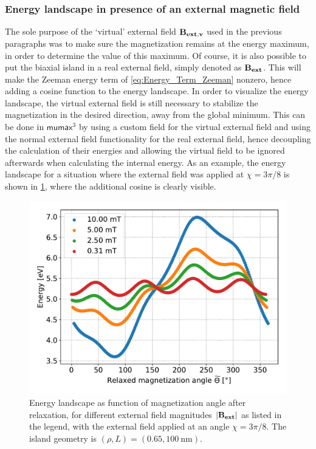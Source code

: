 \documentclass[11pt,a4paper,english]{article}
\newcommand{\mumax}{$\mathsf{mumax}^3$}
\begin{document}
\subsubsection{Energy landscape in presence of an external magnetic field}
The sole purpose of the `virtual' external field $\vb{B_{ext,v}}$ used in the previous paragraphs was to make sure the magnetization remains at the energy maximum, in order to determine the value of this maximum. Of course, it is also possible to put the biaxial island in a real external field, simply denoted as $\vb{B_{ext}}$. This will make the Zeeman energy term of \cref{eq:Energy_Term_Zeeman} nonzero, hence adding a cosine function to the energy landscape. In order to visualize the energy landscape, the virtual external field is still necessary to stabilize the magnetization in the desired direction, away from the global minimum. This can be done in \mumax{} by using a custom field for the virtual external field and using the normal external field functionality for the real external field, hence decoupling the calculation of their energies and allowing the virtual field to be ignored afterwards when calculating the internal energy. As an example, the energy landscape for a situation where the external field was applied at $\chi=3\pi/8$ is shown in \cref{fig:barrierLandscape_extField}, where the additional cosine is clearly visible.
\begin{figure}[b!]
    \centering
    \includegraphics[width=0.9\columnwidth]{Figures/biaxial_island/BarrierLandscape/Ext_K0.1Ms2_Bext1e-2-1e-4_a3Pi8.pdf}
    \caption{Energy landscape as function of magnetization angle after relaxation, for different external field magnitudes $\abs{\vb{B_{ext}}}$ as listed in the legend, with the external field applied at an angle $\chi=3\pi/8$. The island geometry is $(\rho,L)=(0.65,\SI{100}{\nano\metre})$.}
    \label{fig:barrierLandscape_extField}
\end{figure}
\end{document}
